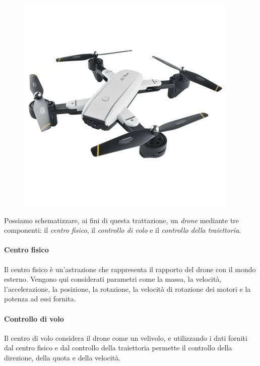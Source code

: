 \documentclass[11pt,a4paper]{report}
\begin{document}
\begin{figure}[H]
\centering
\includegraphics[scale=0.5]{drone.jpg}
\end{figure}

Possiamo schematizzare, ai fini di questa trattazione, un \textit{drone} mediante tre componenti: il \textit{centro fisico}, il \textit{controllo di volo} e il \textit{controllo della traiettoria}.



\paragraph{Centro fisico}

Il centro fisico è un'astrazione che rappresenta il rapporto del drone con il mondo esterno. Vengono qui considerati parametri come la massa, la velocità, l'accelerazione, la posizione, la rotazione, la velocità di rotazione dei motori e la potenza ad essi fornita.

\paragraph{Controllo di volo}

Il centro di volo considera il drone come un velivolo, e utilizzando i dati forniti dal centro fisico e dal controllo della traiettoria permette il controllo della direzione, della quota e della velocità.
\end{document}
